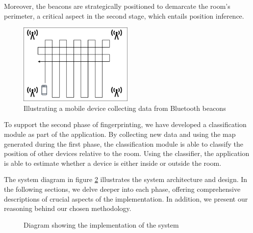 Moreover, the beacons are strategically positioned to demarcate the room's perimeter, a critical aspect in the second stage, which entails position inference.

\begin{figure}[H]
    \centering
    \includegraphics[width=0.5\textwidth]{images/CreateMap.drawio.png}
    \caption{Illustrating a mobile device collecting data from Bluetooth beacons}
    \label{fig:CreateMap}
\end{figure}

To support the second phase of fingerprinting, we have developed a classification module as part of the application. 
By collecting new data and using the map generated during the first phase, the classification module is able to classify the position of other devices relative to the room. 
Using the classifier, the application is able to estimate whether a device is either inside or outside the room.

The system diagram in figure \ref{fig:implementation_diagram} illustrates the system architecture and design.
In the following sections, we delve deeper into each phase, offering comprehensive descriptions of crucial aspects of the implementation. In addition, we present our reasoning behind our chosen methodology.

\begin{figure}[H]
  \centering
  \caption{Diagram showing the implementation of the system}
  \label{fig:implementation_diagram}
\end{figure}